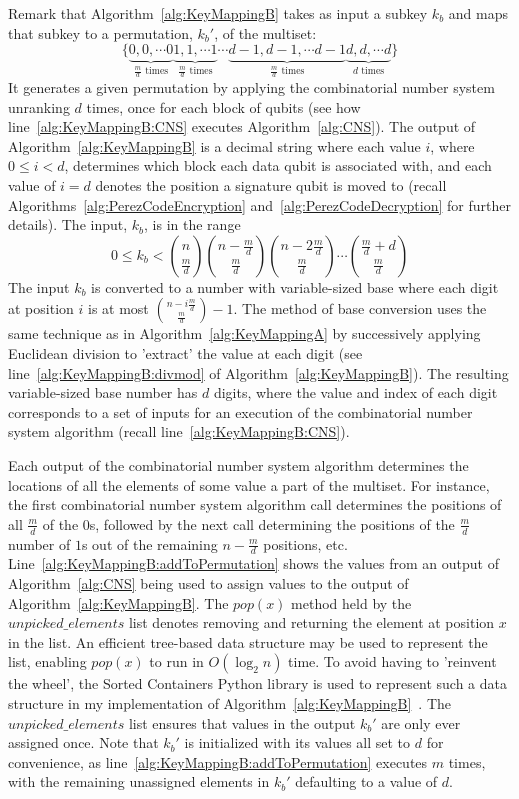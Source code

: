 Remark that Algorithm~\ref{alg:KeyMappingB} takes as input a subkey $k_b$ and maps that subkey to a permutation, $k_b'$, of the multiset:
\begin{equation}
    \{\underbrace{0, 0, \cdots 0}_{\frac{m}{d} \text{ times}}\underbrace{1, 1, \cdots 1}_{\frac{m}{d} \text{ times}}\cdots\underbrace{d-1, d-1, \cdots d-1}_{\frac{m}{d} \text{ times}}\underbrace{d, d, \cdots d}_{d \text{ times}}\}
\end{equation}
It generates a given permutation by applying the combinatorial number system unranking $d$ times, once for each block of qubits (see how line~\ref{alg:KeyMappingB:CNS} executes Algorithm~\ref{alg:CNS}). The output of Algorithm~\ref{alg:KeyMappingB} is a decimal string where each value $i$, where $0 \leq i < d$, determines which block each data qubit is associated with, and each value of $i = d$ denotes the position a signature qubit is moved to (recall Algorithms~\ref{alg:PerezCodeEncryption} and~\ref{alg:PerezCodeDecryption} for further details). 
The input, $k_b$, is in the range $$0 \leq k_b < {n \choose \frac{m}{d}}{n - \frac{m}{d} \choose \frac{m}{d}}{n - 2\frac{m}{d} \choose \frac{m}{d}}\cdots{\frac{m}{d} + d \choose \frac{m}{d}}$$ The input $k_b$ is converted to a number with variable-sized base where each digit at position $i$ is at most ${n - i\frac{m}{d} \choose \frac{m}{d}} - 1$. The method of base conversion uses the same technique as in Algorithm~\ref{alg:KeyMappingA} by successively applying Euclidean division to 'extract' the value at each digit (see line~\ref{alg:KeyMappingB:divmod} of Algorithm~\ref{alg:KeyMappingB}). The resulting variable-sized base number has $d$ digits, where the value and index of each digit corresponds to a set of inputs for an execution of the combinatorial number system algorithm (recall line~\ref{alg:KeyMappingB:CNS}). 

Each output of the combinatorial number system algorithm determines the locations of all the elements of some value a part of the multiset. For instance, the first combinatorial number system algorithm call determines the positions of all $\frac{m}{d}$ of the $0$s, followed by the next call determining the positions of the $\frac{m}{d}$ number of $1$s out of the remaining $n - \frac{m}{d}$ positions, etc. Line~\ref{alg:KeyMappingB:addToPermutation} shows the values from an output of Algorithm~\ref{alg:CNS} being used to assign values to the output of Algorithm~\ref{alg:KeyMappingB}. The $pop(x)$ method held by the $\mathit{unpicked\_elements}$ list denotes removing and returning the element at position $x$ in the list. An efficient tree-based data structure may be used to represent the list, enabling $pop(x)$ to run in $O\left(\log_2 n\right)$ time. To avoid having to 'reinvent the wheel', the Sorted Containers Python library is used to represent such a data structure in my implementation of Algorithm~\ref{alg:KeyMappingB}~\cite{sortedContainers}. The $\mathit{unpicked\_elements}$ list ensures that values in the output $k_b'$ are only ever assigned once. Note that $k_b'$ is initialized with its values all set to $d$ for convenience, as line~\ref{alg:KeyMappingB:addToPermutation} executes $m$ times, with the remaining unassigned elements in $k_b'$ defaulting to a value of $d$.

